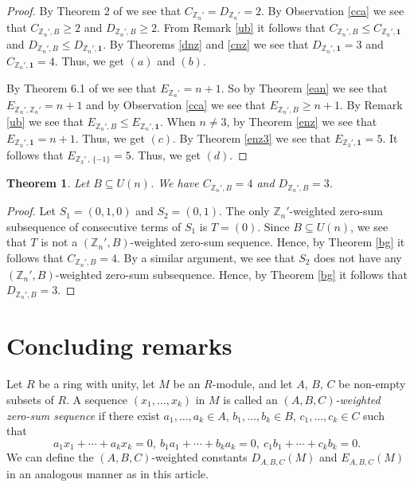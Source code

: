 \documentclass{article}[11pt]
\newtheorem{theorem}{Theorem}[section]
\theoremstyle{definition}
\begin{document}
\begin{proof}
By Theorem 2 of \cite{SKS1} we see that $C_{\mathbb Z_n'}=D_{\mathbb Z_n'}=2$. By Observation \ref{cca} we see that $C_{\mathbb Z_n',B}\geq 2$ and $D_{\mathbb Z_n',B}\geq 2$. From Remark \ref{ub} it follows that $C_{\mathbb Z_n',B}\leq C_{\mathbb Z_n',\mathbf 1}$ and $D_{\mathbb Z_n',B}\leq D_{\mathbb Z_n',\mathbf 1}$. By Theorems \ref{dnz} and \ref{cnz} we see that $D_{\mathbb Z_n',\mathbf 1}=3$ and $C_{\mathbb Z_n',\mathbf 1}=4$. Thus, we get $(a)$ and $(b)$.

By Theorem 6.1 of \cite{ACFKP} we see that $E_{\mathbb Z_n'}=n+1$. So by Theorem \ref{ean} we see that $E_{\mathbb Z_n',\mathbb Z_n'}=n+1$ and by Observation \ref{cca} we see that $E_{\mathbb Z_n',B}\geq n+1$. By Remark \ref{ub} we see that $E_{\mathbb Z_n',B}\leq E_{\mathbb Z_n',\mathbf 1}$. When $n\neq 3$, by Theorem \ref{enz} we see that $E_{\mathbb Z_n',\mathbf 1}=n+1$. Thus, we get $(c)$. By Theorem \ref{enz3} we see that $E_{\mathbb Z_3',\mathbf 1}=5$. It follows that $E_{\mathbb Z_3'\,,\,\{-1\}}=5$. Thus, we get $(d)$.
\end{proof}

\begin{theorem}\label{dnb}
Let $B\subseteq U(n)$. We have $C_{\mathbb Z_n',B}=4$ and $D_{\mathbb Z_n',B}=3$.
\end{theorem}

\begin{proof}
Let $S_1=(0,1,0)$ and $S_2=(0,1)$. The only $\mathbb Z_n'$-weighted zero-sum subsequence of consecutive terms of $S_1$ is $T=(0)$. Since $B\subseteq U(n)$, we see that $T$ is not a $(\mathbb Z_n',B)$-weighted zero-sum sequence. Hence, by Theorem \ref{bg} it follows that $C_{\mathbb Z_n',B}=4$. By a similar argument, we see that $S_2$ does not have any $(\mathbb Z_n',B)$-weighted zero-sum subsequence. Hence, by Theorem \ref{bg} it follows that $D_{\mathbb Z_n',B}=3$.
\end{proof}




\section{Concluding remarks}

Let $R$ be a ring with unity, let $M$ be an $R$-module, and let $A$, $B$, $C$ be non-empty subsets of $R$. A sequence $(x_1,\ldots,x_k)$ in $M$ is called an {\it $(A,B,C)$-weighted zero-sum sequence} if there exist $a_1,\ldots,a_k\in A$, $b_1,\ldots,b_k\in B$, $c_1,\ldots,c_k\in C$ such that
\[a_1x_1+\cdots+a_kx_k=0,~b_1a_1+\cdots+b_ka_k=0,~c_1b_1+\cdots+c_kb_k=0.\]
We can define the $(A,B,C)$-weighted constants $D_{A,B,C}(M)$ and $E_{A,B,C}(M)$ in an analogous manner as in this article.
\end{document}
